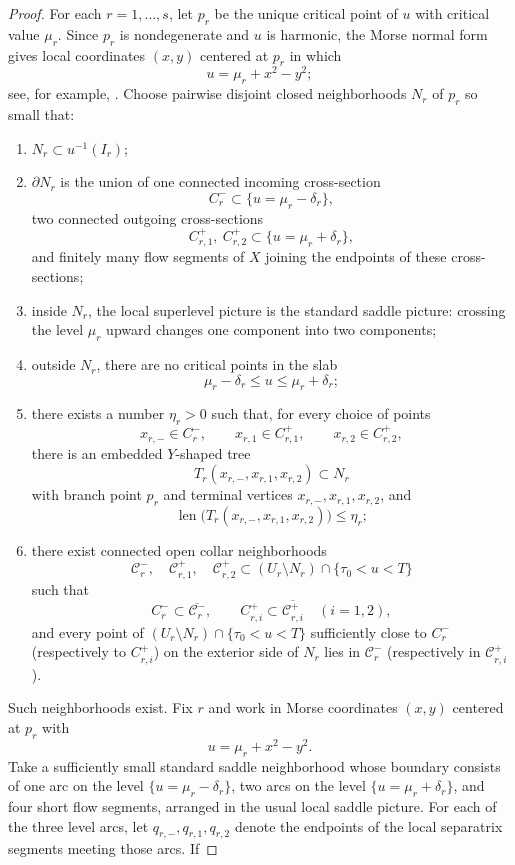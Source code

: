 \documentclass[12pt]{amsart}
\theoremstyle{definition}
\theoremstyle{remark}
\begin{document}
\begin{proof}
\indent For each $r=1,\dots,s$, let $p_r$ be the unique critical point of $u$ with critical value $\mu_r$. Since $p_r$ is
nondegenerate and $u$ is harmonic, the Morse normal form gives local coordinates $(x,y)$ centered at
$p_r$ in which
\[
 u=\mu_r+x^2-y^2;
\]
see, for example, \cite{Milnor1963}. Choose pairwise disjoint closed neighborhoods $N_r$ of $p_r$ so small that:
\begin{enumerate}
\item[(i)] $N_r\subset u^{-1}(I_r)$;
\item[(ii)] $\partial N_r$ is the union of one connected incoming cross-section
\[
 C_r^-\subset\{u=\mu_r-\delta_r\},
\]
two connected outgoing cross-sections
\[
 C_{r,1}^+,\ C_{r,2}^+\subset\{u=\mu_r+\delta_r\},
\]
and finitely many flow segments of $X$ joining the endpoints of these cross-sections;
\item[(iii)] inside $N_r$, the local superlevel picture is the standard saddle picture: crossing the level $\mu_r$
      upward changes one component into two components;
\item[(iv)] outside $N_r$, there are no critical points in the slab
\[
 \mu_r-\delta_r\le u\le \mu_r+\delta_r;
\]
\item[(v)] there exists a number $\eta_r>0$ such that, for every choice of points
\[
x_{r,-}\in C_r^-,
\qquad
x_{r,1}\in C_{r,1}^+,
\qquad
x_{r,2}\in C_{r,2}^+,
\]
there is an embedded $Y$-shaped tree
\[
T_r(x_{r,-},x_{r,1},x_{r,2})\subset N_r
\]
with branch point $p_r$ and terminal vertices $x_{r,-},x_{r,1},x_{r,2}$, and
\[
\operatorname{len}\bigl(T_r(x_{r,-},x_{r,1},x_{r,2})\bigr)\le \eta_r;
\]
\item[(vi)] there exist connected open collar neighborhoods
\[
\mathcal C_r^-,
\quad
\mathcal C_{r,1}^+,
\quad
\mathcal C_{r,2}^+
\subset (U_r\setminus N_r)\cap\{\tau_0<u<T\}
\]
such that
\[
C_r^- \subset \overline{\mathcal C_r^-},
\qquad
C_{r,i}^+ \subset \overline{\mathcal C_{r,i}^+} \quad (i=1,2),
\]
and every point of $(U_r\setminus N_r)\cap\{\tau_0<u<T\}$ sufficiently close to $C_r^-$
(respectively to $C_{r,i}^+$) on the exterior side of $N_r$ lies in $\mathcal C_r^-$
(respectively in $\mathcal C_{r,i}^+$).
\end{enumerate}
Such neighborhoods exist. Fix $r$ and work in Morse coordinates $(x,y)$ centered at $p_r$ with
\[
u=\mu_r+x^2-y^2.
\]
Take a sufficiently small standard saddle neighborhood whose boundary consists of one arc on the level $\{u=\mu_r-\delta_r\}$, two arcs on the level $\{u=\mu_r+\delta_r\}$, and four short flow segments, arranged in the usual local saddle picture. For each of the three level arcs, let $q_{r,-},q_{r,1},q_{r,2}$ denote the endpoints of the local separatrix segments meeting those arcs. If

\end{proof}
\end{document}
